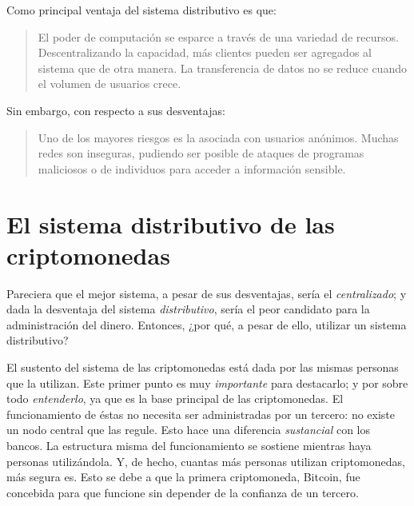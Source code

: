 \documentclass[12pt,a4paper,twoside]{book}
\begin{document}
Como principal ventaja del sistema distributivo es que:

\begin{quotation}
El poder de computación se esparce a través de una variedad de recursos. Descentralizando la capacidad, más clientes pueden ser agregados al sistema que de otra manera. La transferencia de datos no se reduce cuando el volumen de usuarios crece. \cite{sist:p2p}
\end{quotation}

Sin embargo, con respecto a sus desventajas:

\begin{quotation}
Uno de los mayores riesgos es la asociada con usuarios anónimos. Muchas redes son inseguras, pudiendo ser posible de ataques de programas maliciosos o de individuos para acceder a información sensible. \cite{sist:p2p}
\end{quotation}

\section{El sistema distributivo de las criptomonedas}
Pareciera que el mejor sistema, a pesar de sus desventajas, sería el \textit{centralizado}; y dada la desventaja del sistema \textit{distributivo}, sería el peor candidato para la administración del dinero. Entonces, ¿por qué, a pesar de ello, utilizar un sistema distributivo?

El sustento del sistema de las criptomonedas está dada por las mismas personas que la utilizan. Este primer punto es muy \textit{importante} para destacarlo; y por sobre todo \textit{entenderlo}, ya que es la base principal de las criptomonedas. El funcionamiento de éstas no necesita ser administradas por un tercero: no existe un nodo central que las regule. Esto hace una diferencia \textit{sustancial} con los bancos. La estructura misma del funcionamiento se sostiene mientras haya personas utilizándola. Y, de hecho, cuantas más personas utilizan criptomonedas, más segura es. Esto se debe a que la primera criptomoneda, Bitcoin, fue concebida para que funcione sin depender de la confianza de un tercero.
\end{document}
